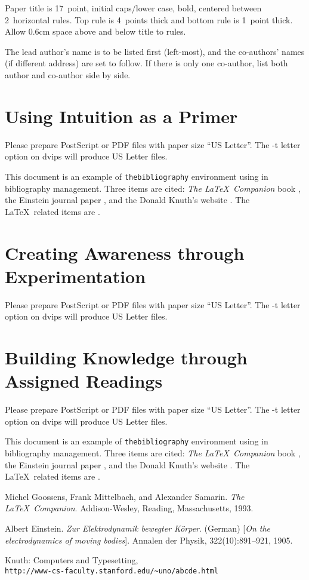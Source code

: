 \documentclass[11pt]{article} %
\begin{document}
Paper title is 17~point, initial caps/lower case, bold, centered between
2~horizontal rules. Top rule is 4~points thick and bottom rule is 1~point
thick. Allow 0.6cm space above and below title to rules. 

The lead author's name is to be listed first (left-most), and
the co-authors' names (if different address) are set to follow. If
there is only one co-author, list both author and co-author side by side.

\section{Using Intuition as a Primer}

Please prepare PostScript or PDF files with paper size ``US Letter''.
The -t letter option on dvips will produce US Letter files.

This document is an example of \texttt{thebibliography} environment using 
in bibliography management. Three items are cited: \textit{The \LaTeX\ Companion} 
book \cite{latexcompanion}, the Einstein journal paper \cite{einstein}, and the 
Donald Knuth's website \cite{knuthwebsite}. The \LaTeX\ related items are
\cite{latexcompanion,knuthwebsite}.

\section{Creating Awareness through Experimentation}

Please prepare PostScript or PDF files with paper size ``US Letter''.
The -t letter option on dvips will produce US Letter files.

\section{Building Knowledge through Assigned Readings}

Please prepare PostScript or PDF files with paper size ``US Letter''.
The -t letter option on dvips will produce US Letter files.

This document is an example of \texttt{thebibliography} environment using 
in bibliography management. Three items are cited: \textit{The \LaTeX\ Companion} 
book \cite{latexcompanion}, the Einstein journal paper \cite{einstein}, and the 
Donald Knuth's website \cite{knuthwebsite}. The \LaTeX\ related items are
\cite{latexcompanion,knuthwebsite}.

\medskip
 
\begin{thebibliography}{9}
Michel Goossens, Frank Mittelbach, and Alexander Samarin. 
\textit{The \LaTeX\ Companion}. 
Addison-Wesley, Reading, Massachusetts, 1993.
 
Albert Einstein. 
\textit{Zur Elektrodynamik bewegter K{\"o}rper}. (German) 
[\textit{On the electrodynamics of moving bodies}]. 
Annalen der Physik, 322(10):891–921, 1905.
 
Knuth: Computers and Typesetting,
\\\texttt{http://www-cs-faculty.stanford.edu/\~{}uno/abcde.html}
\end{thebibliography}
\end{document}
